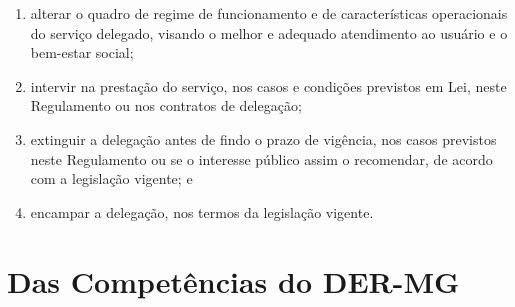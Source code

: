 \begin{enumerate}[resume, label=Art. \arabic*]
\begin{enumerate}[label=\roman*.]
\item alterar o quadro de regime de funcionamento e de características operacionais do serviço delegado, visando o melhor e adequado atendimento ao usuário e o bem-estar social;

\item intervir na prestação do serviço, nos casos e condições previstos em Lei, neste Regulamento ou nos contratos de delegação;

\item extinguir a delegação antes de findo o prazo de vigência, nos casos previstos neste Regulamento ou se o interesse público assim o recomendar, de acordo com a legislação vigente; e

\item encampar a delegação, nos termos da legislação vigente.

\end{enumerate}

\end{enumerate}

\section{Das Competências do DER-MG}

